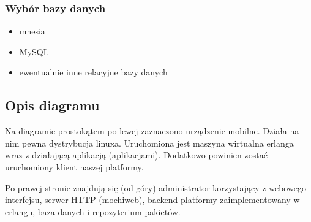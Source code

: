 \documentclass[polish,12pt]{aghthesis}
\begin{document}
\subsubsection {Wybór bazy danych}
\begin{itemize}
\item mnesia
\item MySQL
\item ewentualnie inne relacyjne bazy danych
\end{itemize}

\centerline{
}

\subsection{Opis diagramu}
Na diagramie prostokątem po lewej zaznaczono urządzenie mobilne. Działa na nim pewna dystrybucja linuxa. Uruchomiona jest maszyna wirtualna erlanga wraz z działającą aplikacją (aplikacjami). Dodatkowo powinien zostać uruchomiony klient naszej platformy.

Po prawej stronie znajdują się (od góry) administrator korzystający z webowego interfejsu, serwer HTTP (mochiweb), backend platformy zaimplementowany w erlangu, baza danych i repozyterium pakietów.
\end{document}

